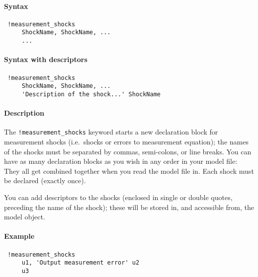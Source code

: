 


	\paragraph{Syntax}
 
 \begin{verbatim}
 !measurement_shocks
     ShockName, ShockName, ...
     ...
 \end{verbatim}
 
 \paragraph{Syntax with descriptors}
 
 \begin{verbatim}
 !measurement_shocks
     ShockName, ShockName, ...
     'Description of the shock...' ShockName
 \end{verbatim}
 
 \paragraph{Description}
 
 The \texttt{!measurement\_shocks} keyword starts a new declaration block
 for measurement shocks (i.e.~shocks or errors to measurement equation);
 the names of the shocks must be separated by commas, semi-colons, or
 line breaks. You can have as many declaration blocks as you wish in any
 order in your model file: They all get combined together when you read
 the model file in. Each shock must be declared (exactly once).
 
 You can add descriptors to the shocks (enclosed in single or double
 quotes, preceding the name of the shock); these will be stored in, and
 accessible from, the model object.
 
 \paragraph{Example}
 
 \begin{verbatim}
 !measurement_shocks
     u1, 'Output measurement error' u2
     u3
 \end{verbatim}


